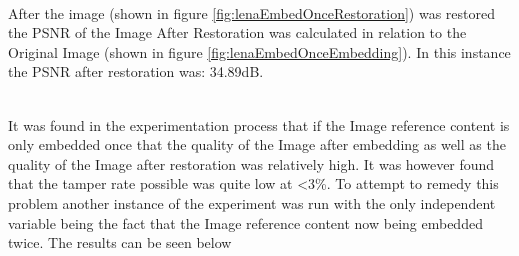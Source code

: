 \documentclass[12pt]{article}
\begin{document}
\hspace{0pt} \\
After the image (shown in figure \ref{fig:lenaEmbedOnceRestoration}) was restored the PSNR of the Image After Restoration was calculated in relation to the Original Image (shown in figure \ref{fig:lenaEmbedOnceEmbedding}).
In this instance the PSNR after restoration was: 34.89dB.

\hspace{0pt} \\
It was found in the experimentation process that if the Image reference content is only embedded once that the quality of the Image after embedding as well as the quality of the Image after restoration was relatively high.
It was however found that the tamper rate possible was quite low at \textless 3\%.
To attempt to remedy this problem another instance of the experiment was run with the only independent variable being the fact that the Image reference content now being embedded twice.
The results can be seen below
\end{document}
